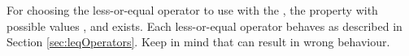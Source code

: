 For choosing the less-or-equal operator to use with the \constraintsCPA, the property 
with possible values ,  and  exists.
Each less-or-equal operator behaves as described in Section \ref{sec:leqOperators}.
Keep in mind that  can result in wrong behaviour.
